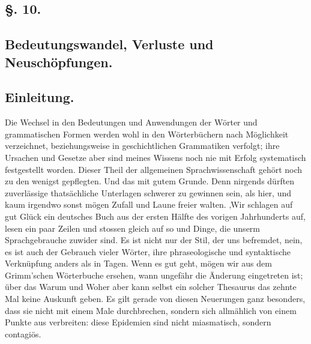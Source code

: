 {
\subsection*{§. 10.}\label{III.II.II.10}
\subsection*{Bedeutungswandel, Verluste und Neuschöpfungen.}
\subsection*{Einleitung.}
Die Wechsel in den Bedeutungen und Anwendungen der Wörter und grammatischen Formen werden wohl in den Wörterbüchern nach Möglichkeit verzeichnet, beziehungsweise in geschichtlichen Grammatiken verfolgt; ihre Ursachen und Gesetze aber sind meines Wissens noch nie mit Erfolg systematisch festgestellt worden. Dieser Theil der allgemeinen \label{fp.226} Sprachwissenschaft gehört noch zu den wenigst gepflegten. Und das mit gutem Grunde. Denn nirgends dürften zuverlässige thatsächliche Unterlagen schwerer zu gewinnen sein, als hier, und kaum irgendwo sonst mögen Zufall und Laune freier walten. ‚Wir schlagen auf gut Glück ein deutsches Buch aus der ersten Hälfte des vorigen Jahrhunderts \label{sp.228} auf, lesen ein paar Zeilen und stossen gleich auf so und  Dinge, die unserm Sprachgebrauche zuwider sind. Es ist nicht nur der Stil, der uns befremdet, nein, es ist auch der Gebrauch vieler Wörter, ihre phraseologische und syntaktische Verknüpfung anders als in  Tagen. Wenn es gut geht, mögen wir aus dem Grimm’schen Wörterbuche ersehen, wann ungefähr die Änderung eingetreten ist; über das Warum und Woher aber kann selbst ein solcher Thesaurus das zehnte Mal keine Auskunft geben. Es gilt gerade von diesen Neuerungen ganz besonders, dass sie nicht mit einem Male durchbrechen, sondern sich allmählich von einem Punkte aus verbreiten: diese Epidemien sind nicht miasmatisch, sondern contagiös.


}
